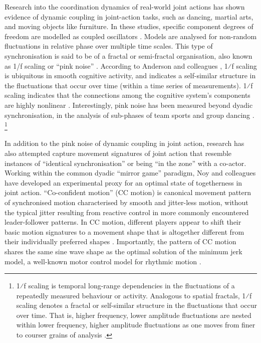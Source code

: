 \begin{CJK}{UTF8}{gbsn}
Research into the coordination dynamics of real-world joint actions  has shown evidence of dynamic coupling in joint-action tasks, such as dancing, martial arts, and moving objects like furniture.  In these studies, specific component degrees of freedom are modelled as coupled oscillators \citep[using the HKB model, which describes the change in the relative phase between two oscillatory components.   See][]{Haken1985,Kelso1986}.  Models are analysed for non-random fluctuations in relative phase over multiple time scales.  This type of synchronisation is said to be of a fractal or semi-fractal organisation, also known as 1/f scaling or ``pink noise'' \citep{Caron2017}. According to Anderson and colleagues \citep{Anderson2012}, 1⁄f scaling is ubiquitous in smooth cognitive activity, and indicates a self-similar structure in the fluctuations that occur over time (within a time series of measurements).
1⁄f scaling indicates that the connections among the cognitive system's components are highly nonlinear \citep{Ding2002,Holden2013,Kello2010,Riley2011,VanOrden2003,VanOrden2005}. Interestingly, pink noise has been measured beyond dyadic synchronisation, in the analysis of sub-phases of team sports \citep{Passos2014,Duarte2012} and group dancing \citep{Chauvigne2017}.
  \footnote{1⁄f scaling is temporal long-range dependencies in the fluctuations of a repeatedly measured behaviour or activity. Analogous to spatial fractals, 1⁄f scaling denotes a fractal or self-similar structure in the fluctuations that occur over time. That is, higher frequency, lower amplitude fluctuations are nested within lower frequency, higher amplitude fluctuations as one moves from finer to courser grains of analysis \cites(for a more detailed description see, for example)(){Holden2005}{Kello2009}.}

In addition to the pink noise of dynamic coupling in joint action, research has also attempted capture movement signatures of joint action that resemble instances of ``identical synchronisation'' or  being ``in the zone'' with a co-actor.  Working within the common dyadic ``mirror game'' paradigm, Noy and colleagues \textcite{Noy2011,Noy2015,Hart2014} have developed an experimental proxy for an optimal state of togetherness in joint action.  ``Co-confident motion'' (CC motion) is canonical movement pattern of synchronised motion characterised by smooth and jitter-less motion, without the typical jitter resulting from reactive control in more commonly encountered leader-follower patterns.  In CC motion, different players appear to shift their basic motion signatures to a movement shape that is altogether different from their individually preferred shapes \citep{Hart2014}. Importantly, the pattern of CC motion shares the same sine wave shape as the optimal solution of the minimum jerk model, a well-known motor control model for rhythmic motion \citep{Hogan2007}.


\end{CJK}
